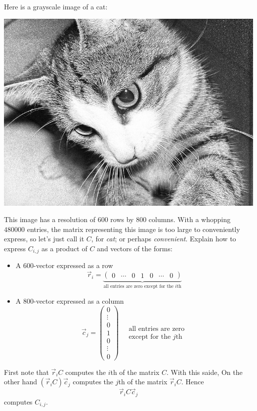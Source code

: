 \documentclass{ximera}
\begin{document}
\begin{example}[Grayscale Image]%
  Here is a grayscale image of a cat:
  \begin{image}
  \includegraphics[width=.5\textwidth]{catface.jpg}
  \end{image}
  This image has a resolution of $600$ rows by $800$ columns. With a
  whopping $480000$ entries, the matrix representing this image is too
  large to conveniently express, so let's just call it $C$, for
  \textit{cat}; or perhaps \textit{convenient}.  Explain how to
  express $C_{i,j}$ as a product of $C$ and vectors of the forms:
  \begin{itemize}
    \item A $600$-vector expressed as a row
      \[
      \vec r_i = \underbrace{\begin{pmatrix} 0 & \cdots  & 0 & 1 & 0 & \cdots & 0 \end{pmatrix}}_{\text{all entries are zero except for the $i$th}}
      \]
    \item A $800$-vector expressed as a column
      \[
      \vec c_j=\begin{pmatrix} 0 \\ \vdots  \\ 0 \\ 1 \\ 0 \\ \vdots \\ 0 \end{pmatrix}\quad \begin{matrix}
        \text{all entries are zero}\\
        \text{except for the $j$th}
      \end{matrix}
      \]
  \end{itemize}
  \begin{explanation}
    First note that $\vec r_i C$ computes the $i$th
     of the matrix
    $C$. With this saide, On the other hand $(\vec r_i C)\vec c_j$ computes the $j$th
     of the matrix
    $\vec r_i C$. Hence
    \[
    \vec r_i C\vec{c}_j
    \]
    computes $C_{i,j}$.
  \end{explanation}
\end{example}
\end{document}
